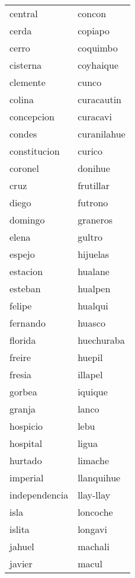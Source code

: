 \begin{longtable}{l|l}
             central   &  concon   \\  
             cerda   &  copiapo   \\  
             cerro   &  coquimbo   \\  
             cisterna   &  coyhaique   \\  
             clemente   &  cunco   \\  
             colina   &  curacautin   \\  
             concepcion   &  curacavi   \\  
             condes   &  curanilahue   \\  
             constitucion   &  curico   \\  
             coronel   &  donihue   \\  
             cruz   &  frutillar   \\  
             diego   &  futrono   \\  
             domingo   &  graneros   \\  
             elena   &  gultro   \\  
             espejo   &  hijuelas   \\  
             estacion   &  hualane   \\  
             esteban   &  hualpen   \\  
             felipe   &  hualqui   \\  
             fernando   &  huasco   \\  
             florida   &  huechuraba   \\  
             freire   &  huepil   \\  
             fresia   &  illapel   \\  
             gorbea   &  iquique   \\  
             granja   &  lanco   \\  
             hospicio   &  lebu   \\  
             hospital   &  ligua   \\  
             hurtado   &  limache   \\  
             imperial   &  llanquihue   \\  
             independencia   &  llay-llay   \\  
             isla   &  loncoche   \\  
             islita   &  longavi   \\  
             jahuel   &  machali   \\  
             javier   &  macul   \\  

\end{longtable}
